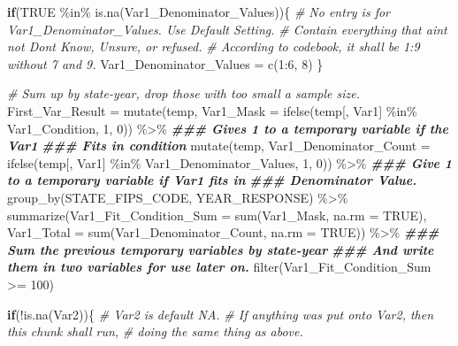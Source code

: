 \documentclass[
]{article}
\newenvironment{Shaded}{\begin{snugshade}}{\end{snugshade}}
\newcommand{\AttributeTok}[1]{\textcolor[rgb]{0.77,0.63,0.00}{#1}}
\newcommand{\CommentTok}[1]{\textcolor[rgb]{0.56,0.35,0.01}{\textit{#1}}}
\newcommand{\ConstantTok}[1]{\textcolor[rgb]{0.00,0.00,0.00}{#1}}
\newcommand{\ControlFlowTok}[1]{\textcolor[rgb]{0.13,0.29,0.53}{\textbf{#1}}}
\newcommand{\DecValTok}[1]{\textcolor[rgb]{0.00,0.00,0.81}{#1}}
\newcommand{\DocumentationTok}[1]{\textcolor[rgb]{0.56,0.35,0.01}{\textbf{\textit{#1}}}}
\newcommand{\FunctionTok}[1]{\textcolor[rgb]{0.00,0.00,0.00}{#1}}
\newcommand{\NormalTok}[1]{#1}
\newcommand{\OtherTok}[1]{\textcolor[rgb]{0.56,0.35,0.01}{#1}}
\newcommand{\SpecialCharTok}[1]{\textcolor[rgb]{0.00,0.00,0.00}{#1}}
\begin{document}
\begin{Shaded}
\begin{Highlighting}[]
  \ControlFlowTok{if}\NormalTok{(}\ConstantTok{TRUE} \SpecialCharTok{\%in\%} \FunctionTok{is.na}\NormalTok{(Var1\_Denominator\_Values))\{}
    \CommentTok{\# No entry is for Var1\_Denominator\_Values. Use Default Setting.}
    \CommentTok{\# Contain everything that ain\textquotesingle{}t not Don\textquotesingle{}t Know, Unsure, or refused.}
    \CommentTok{\# According to codebook, it shall be 1:9 without 7 and 9.}
\NormalTok{    Var1\_Denominator\_Values }\OtherTok{=} \FunctionTok{c}\NormalTok{(}\DecValTok{1}\SpecialCharTok{:}\DecValTok{6}\NormalTok{, }\DecValTok{8}\NormalTok{)}
\NormalTok{  \}}
  
  \CommentTok{\# Sum up by state{-}year, drop those with too small a sample size.}
\NormalTok{  First\_Var\_Result }\OtherTok{=} \FunctionTok{mutate}\NormalTok{(temp, }
                            \AttributeTok{Var1\_Mask =} \FunctionTok{ifelse}\NormalTok{(temp[, Var1] }\SpecialCharTok{\%in\%}\NormalTok{ Var1\_Condition, }
                                               \DecValTok{1}\NormalTok{, }\DecValTok{0}\NormalTok{)) }\SpecialCharTok{\%\textgreater{}\%} 
    \DocumentationTok{\#\#\# Gives 1 to a temporary variable if the Var1}
    \DocumentationTok{\#\#\# Fits in condition}
    \FunctionTok{mutate}\NormalTok{(temp, }\AttributeTok{Var1\_Denominator\_Count =} 
             \FunctionTok{ifelse}\NormalTok{(temp[, Var1] }\SpecialCharTok{\%in\%}\NormalTok{ Var1\_Denominator\_Values, }\DecValTok{1}\NormalTok{, }\DecValTok{0}\NormalTok{)) }\SpecialCharTok{\%\textgreater{}\%}
    \DocumentationTok{\#\#\# Give 1 to a temporary variable if Var1 fits in}
    \DocumentationTok{\#\#\# Denominator Value.}
    \FunctionTok{group\_by}\NormalTok{(STATE\_FIPS\_CODE, YEAR\_RESPONSE) }\SpecialCharTok{\%\textgreater{}\%} 
    \FunctionTok{summarize}\NormalTok{(}\AttributeTok{Var1\_Fit\_Condition\_Sum =} \FunctionTok{sum}\NormalTok{(Var1\_Mask, }\AttributeTok{na.rm =} \ConstantTok{TRUE}\NormalTok{), }
              \AttributeTok{Var1\_Total =} \FunctionTok{sum}\NormalTok{(Var1\_Denominator\_Count, }\AttributeTok{na.rm =} \ConstantTok{TRUE}\NormalTok{)) }\SpecialCharTok{\%\textgreater{}\%}
    \DocumentationTok{\#\#\# Sum the previous temporary variables by state{-}year }
    \DocumentationTok{\#\#\# And write them in two variables for use later on.}
    \FunctionTok{filter}\NormalTok{(Var1\_Fit\_Condition\_Sum }\SpecialCharTok{\textgreater{}=} \DecValTok{100}\NormalTok{)}
  
  \ControlFlowTok{if}\NormalTok{(}\SpecialCharTok{!}\FunctionTok{is.na}\NormalTok{(Var2))\{}
    \CommentTok{\# Var2 is default NA.}
    \CommentTok{\# If anything was put onto Var2, then this chunk shall run,}
    \CommentTok{\# doing the same thing as above.}
    

\end{Highlighting}
\end{Shaded}
\end{document}
